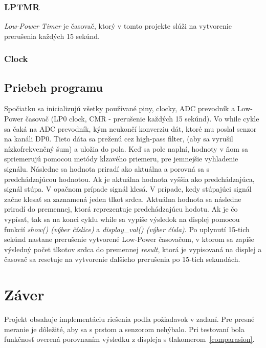 \documentclass[11pt,a4paper]{article}
\begin{document}
	\subsubsection{LPTMR}
	\emph{Low-Power Timer} je časovač, ktorý v tomto projekte slúži na vytvorenie prerušenia každých 15 sekúnd.
	\subsubsection{Clock}
	
	\subsection{Priebeh programu}
	Spočiatku sa inicializujú všetky používané piny, clocky, ADC prevodník a Low-Power časovač (LP0 clock, CMR - prerušenie každých 15 sekúnd). Vo while cykle sa čaká na ADC prevodník, kým neukončí konverziu dát, ktoré mu poslal senzor na kanáli DP0. Tieto dáta sa preženú cez high-pass filter, (aby sa vyrušil nízkofrekvenčný šum) a uložia do pola. Keď sa pole naplní, hodnoty v ňom sa spriemerujú pomocou metódy kĺzavého priemeru, pre jemnejšie vyhladenie signálu. Následne sa hodnota priradí ako aktuálna a porovná sa s predchádzajúcou hodnotou. Ak je aktuálna hodnota vyššia ako predchádzajúca, signál stúpa. V opačnom prípade signál klesá. V prípade, kedy stúpajúci signál začne klesať sa zaznamená jeden tlkot srdca. Aktuálna hodnota sa následne priradí do premennej, ktorá reprezentuje predchádzajúcu hodotu. Ak je čo vypísať, tak sa na konci cyklu while sa vypíše výsledok na displej pomocou funkcií \emph{show() (výber číslice)} a \emph{display\_val() (výber čísla)}. Po uplynutí 15-tich sekúnd nastane prerušenie vytvorené Low-Power časovačom, v ktorom sa zapíše výsledný počet tlkotov srdca do premennej \emph{result}, ktorá je vypisovaná na displej a časovač sa resetuje na vytvorenie ďalšieho prerušenia po 15-tich sekundách.
	
	\newpage
	\section{Záver}
	Projekt obsahuje implementáciu riešenia podľa požiadavok v zadaní. Pre presné meranie je dôležité, aby sa s prstom a senzorom nehýbalo.
	Pri testovaní bola funkčnosť overená porovnaním výsledku z displeja s tlakomerom~\ref{comparasion}.
	
\end{document}
